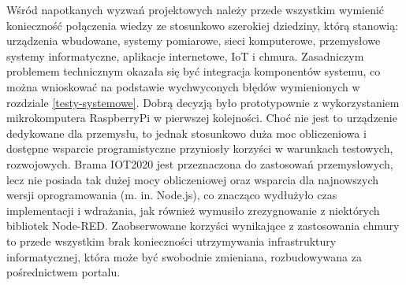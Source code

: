 \documentclass[a4paper, 12pt, twoside]{article}
\begin{document}
Wśród napotkanych wyzwań projektowych należy przede wszystkim wymienić konieczność
połączenia wiedzy ze stosunkowo szerokiej dziedziny, którą stanowią: urządzenia wbudowane,
systemy pomiarowe, sieci komputerowe, przemysłowe systemy informatyczne, aplikacje internetowe, IoT i chmura.
Zasadniczym problemem technicznym okazała się być integracja komponentów systemu, co
można wnioskować na podstawie wychwyconych błędów wymienionych w rozdziale
\ref{testy-systemowe}. Dobrą decyzją było prototypownie z wykorzystaniem
mikrokomputera RaspberryPi w pierwszej kolejności. Choć nie jest to urządzenie
dedykowane dla przemysłu, to jednak stosunkowo duża moc obliczeniowa i
dostępne wsparcie programistyczne przyniosły korzyści w warunkach testowych, rozwojowych.
Brama IOT2020 jest przeznaczona do zastosowań przemysłowych, lecz nie posiada
tak dużej mocy obliczeniowej oraz wsparcia dla najnowszych wersji oprogramowania (m. in. Node.js),
co znacząco wydłużyło czas implementacji i wdrażania, jak również wymusiło
zrezygnowanie z niektórych bibliotek Node-RED. Zaobserwowane korzyści wynikające
z zastosowania chmury to przede wszystkim brak konieczności utrzymywania infrastruktury
informatycznej, która może być swobodnie zmieniana, rozbudowywana za pośrednictwem
portalu.
\end{document}
